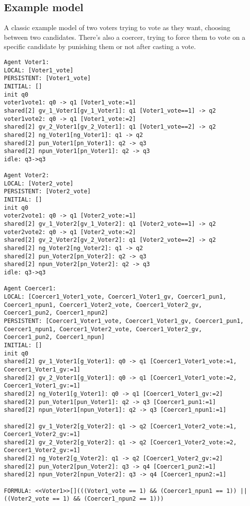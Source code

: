 \documentclass[12pt]{article}
\begin{document}
\subsection{Example model}
A classic example model of two voters trying to vote as they want, choosing between two candidates. There's also a coercer, trying to force them to vote on a specific candidate by punishing them or not after casting a vote.
\begin{lstlisting}
Agent Voter1:
LOCAL: [Voter1_vote]
PERSISTENT: [Voter1_vote]
INITIAL: []
init q0
voter1vote1: q0 -> q1 [Voter1_vote:=1]
shared[2] gv_1_Voter1[gv_1_Voter1]: q1 [Voter1_vote==1] -> q2
voter1vote2: q0 -> q1 [Voter1_vote:=2]
shared[2] gv_2_Voter1[gv_2_Voter1]: q1 [Voter1_vote==2] -> q2
shared[2] ng_Voter1[ng_Voter1]: q1 -> q2
shared[2] pun_Voter1[pn_Voter1]: q2 -> q3
shared[2] npun_Voter1[pn_Voter1]: q2 -> q3
idle: q3->q3

Agent Voter2:
LOCAL: [Voter2_vote]
PERSISTENT: [Voter2_vote]
INITIAL: []
init q0
voter2vote1: q0 -> q1 [Voter2_vote:=1]
shared[2] gv_1_Voter2[gv_1_Voter2]: q1 [Voter2_vote==1] -> q2
voter2vote2: q0 -> q1 [Voter2_vote:=2]
shared[2] gv_2_Voter2[gv_2_Voter2]: q1 [Voter2_vote==2] -> q2
shared[2] ng_Voter2[ng_Voter2]: q1 -> q2
shared[2] pun_Voter2[pn_Voter2]: q2 -> q3
shared[2] npun_Voter2[pn_Voter2]: q2 -> q3
idle: q3->q3

Agent Coercer1:
LOCAL: [Coercer1_Voter1_vote, Coercer1_Voter1_gv, Coercer1_pun1, Coercer1_npun1, Coercer1_Voter2_vote, Coercer1_Voter2_gv, Coercer1_pun2, Coercer1_npun2]
PERSISTENT: [Coercer1_Voter1_vote, Coercer1_Voter1_gv, Coercer1_pun1, Coercer1_npun1, Coercer1_Voter2_vote, Coercer1_Voter2_gv, Coercer1_pun2, Coercer1_npun]
INITIAL: []
init q0
shared[2] gv_1_Voter1[g_Voter1]: q0 -> q1 [Coercer1_Voter1_vote:=1, Coercer1_Voter1_gv:=1]
shared[2] gv_2_Voter1[g_Voter1]: q0 -> q1 [Coercer1_Voter1_vote:=2, Coercer1_Voter1_gv:=1]
shared[2] ng_Voter1[g_Voter1]: q0 -> q1 [Coercer1_Voter1_gv:=2]
shared[2] pun_Voter1[pun_Voter1]: q2 -> q3 [Coercer1_pun1:=1]
shared[2] npun_Voter1[npun_Voter1]: q2 -> q3 [Coercer1_npun1:=1]

shared[2] gv_1_Voter2[g_Voter2]: q1 -> q2 [Coercer1_Voter2_vote:=1, Coercer1_Voter2_gv:=1]
shared[2] gv_2_Voter2[g_Voter2]: q1 -> q2 [Coercer1_Voter2_vote:=2, Coercer1_Voter2_gv:=1]
shared[2] ng_Voter2[g_Voter2]: q1 -> q2 [Coercer1_Voter2_gv:=2]
shared[2] pun_Voter2[pun_Voter2]: q3 -> q4 [Coercer1_pun2:=1]
shared[2] npun_Voter2[npun_Voter2]: q3 -> q4 [Coercer1_npun2:=1]

FORMULA: <<Voter1>>[](((Voter1_vote == 1) && (Coercer1_npun1 == 1)) || ((Voter2_vote == 1) && (Coercer1_npun2 == 1)))
\end{lstlisting}
\end{document}
